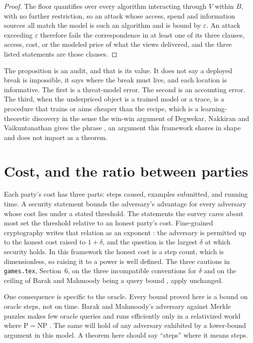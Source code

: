 \documentclass[11pt]{article}
\theoremstyle{definition}
\theoremstyle{plain}
\theoremstyle{remark}
\begin{document}
\begin{proof}
The floor quantifies over every algorithm interacting through $V$ within $B$,
with no further restriction, so an attack whose access, spend and information
sources all match the model is such an algorithm and is bound by $\varepsilon$.
An attack exceeding $\varepsilon$ therefore fails the correspondence in at least
one of its three clauses, access, cost, or the modeled price of what the views
delivered, and the three listed statements are those clauses.
\end{proof}

The proposition is an audit, and that is its value. It does not say a deployed
break is impossible, it says where the break must live, and each location is
informative. The first is a threat-model error. The second is an accounting
error. The third, when the underpriced object is a trained model or a trace, is
a procedure that trains or aims cheaper than the recipe, which is a
learning-theoretic discovery in the sense the win-win argument of Degwekar,
Nakkiran and Vaikuntanathan gives the phrase \cite{DNV19}, an argument this
framework shares in shape and does not import as a theorem.

\section{Cost, and the ratio between parties}
\label{sec:cost}

Each party's cost has three parts: steps caused, examples submitted, and running
time. A security statement bounds the adversary's advantage for every adversary
whose cost lies under a stated threshold. The statements the survey cares about
most set the threshold relative to an honest party's cost. Fine-grained
cryptography writes that relation as an exponent \cite{BC22,LLW19}: the adversary
is permitted up to the honest cost raised to $1+\delta$, and the question is the
largest $\delta$ at which security holds. In this framework the honest cost is a
step count, which is dimensionless, so raising it to a power is well defined. The
three cautions in \texttt{games.tex}, Section~6, on the three incompatible
conventions for $\delta$ and on the ceiling of Barak and Mahmoody being a query bound
\cite{BM09}, apply unchanged.

One consequence is specific to the oracle. Every bound proved here is a bound on
oracle steps, not on time. Barak and Mahmoody's adversary against Merkle puzzles
makes few oracle queries and runs efficiently only in a relativized world where
$\mathrm{P}=\mathrm{NP}$ \cite{BM09}. The same will hold of any adversary exhibited
by a lower-bound argument in this model. A theorem here should say ``steps'' where
it means steps.
\end{document}

